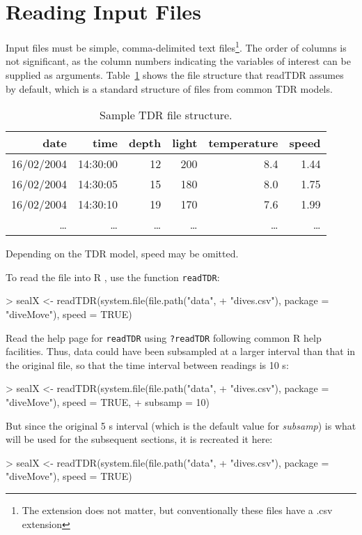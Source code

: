 \documentclass[12pt, letterpaper]{scrartcl}
\newcommand{\Rfunction}[1]{{\texttt{#1}}}
\newcommand{\Rfunarg}[1]{{\textit{#1}}}
\newcommand{\R}{{\normalfont\textsf{R }}{}}
\begin{document}
\section{Reading Input Files}
\label{sec:read-in}

Input files must be simple, comma-delimited text files\footnote{The
  extension does not matter, but conventionally these files have a .csv
  extension}.  The order of columns is not significant, as the column
numbers indicating the variables of interest can be supplied as arguments.
Table~\ref{tab:file-str} shows the file structure that readTDR assumes by
default, which is a standard structure of files from common TDR models.

\begin{table}[bt]
  \caption{Sample TDR file structure.}
  \centering
  \begin{tabular}{rrrrrr}\toprule
    date       & time     & depth  & light  & temperature & speed    \\\midrule
    16/02/2004 & 14:30:00 & 12     & 200    & 8.4         & 1.44     \\
    16/02/2004 & 14:30:05 & 15     & 180    & 8.0         & 1.75     \\
    16/02/2004 & 14:30:10 & 19     & 170    & 7.6         & 1.99     \\
    \ldots     & \ldots   & \ldots & \ldots & \ldots      & \ldots   \\\bottomrule
  \end{tabular}
  \label{tab:file-str}
\end{table}

Depending on the TDR model, speed may be omitted.

To read the file into \R{}, use the function \Rfunction{readTDR}:
\begin{Schunk}
\begin{Sinput}
> sealX <- readTDR(system.file(file.path("data", 
+     "dives.csv"), package = "diveMove"), speed = TRUE)
\end{Sinput}
\end{Schunk}
Read the help page for \Rfunction{readTDR} using \verb|?readTDR| following
common \R{} help facilities.  Thus, data could have been subsampled at a
larger interval than that in the original file, so that the time interval
between readings is 10 s:
\begin{Schunk}
\begin{Sinput}
> sealX <- readTDR(system.file(file.path("data", 
+     "dives.csv"), package = "diveMove"), speed = TRUE, 
+     subsamp = 10)
\end{Sinput}
\end{Schunk}
But since the original 5 s interval (which is the default value for
\Rfunarg{subsamp}) is what will be used for the subsequent sections, it is
recreated it here:
\begin{Schunk}
\begin{Sinput}
> sealX <- readTDR(system.file(file.path("data", 
+     "dives.csv"), package = "diveMove"), speed = TRUE)
\end{Sinput}
\end{Schunk}
\end{document}
